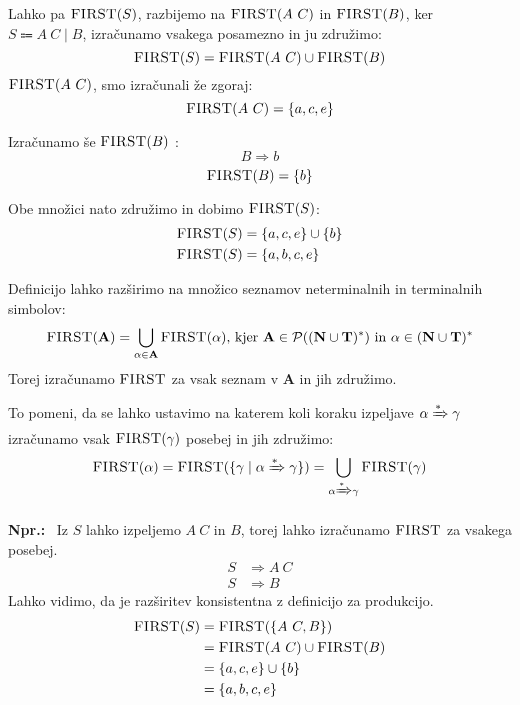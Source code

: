 \documentclass{article}
\newcommand{\Ex}{\textbf{Npr.:}\ }
\newcommand{\FIRST}{\textsc{FIRST}}
\newcommand{\Set}[1]{\mathbf{#1}}
\newcommand{\Terminals}{\Set{T}}
\newcommand{\NonTerminals}{\Set{N}}
\newcommand{\Powerset}[1]{\mathcal{P}(#1)}
\newcommand{\Arrow}{\Coloneqq}
\newcommand{\Derive}{\Rightarrow}
\newcommand{\DeriveStar}{\xRightarrow{\ast}}
\newcommand{\Seq}{\ }
\newcommand{\Union}{\mathrel{|}}
\newcommand{\Kleene}[1]{#1^\ast}
\begin{document}
Lahko pa $\FIRST(S)$, razbijemo na $\FIRST(A \Seq C)$ in $\FIRST(B)$, ker $S \Arrow A \Seq C \Union B$, izračunamo vsakega posamezno in ju združimo:
\begin{equation*}
  \FIRST(S) = \FIRST(A \Seq C) \cup \FIRST(B)
\end{equation*}
$\FIRST(A \Seq C)$, smo izračunali že zgoraj:
\begin{equation*}
  \FIRST(A \Seq C) = \{a, c, e\}
\end{equation*}

Izračunamo še $\FIRST(B)$ :
\begin{equation*}
  B \Derive b
\end{equation*}
\begin{equation*}
  \FIRST(B) = \{b\}
\end{equation*}

Obe množici nato združimo in dobimo $\FIRST(S)$:
\begin{align*}
  \FIRST(S) &= \{a, c, e\} \cup \{b\}\\
  \FIRST(S) &= \{a, b, c, e\}
\end{align*}

Definicijo lahko razširimo na množico seznamov neterminalnih in terminalnih simbolov:
\begin{equation*}
  \FIRST(\Set{A}) = \bigcup_{\alpha \in \Set{A}} \FIRST(\alpha) \text{, kjer } \Set{A} \in \Powerset{\Kleene{(\NonTerminals \cup \Terminals)}} \text{ in } \alpha \in \Kleene{(\NonTerminals \cup \Terminals)}
\end{equation*}
Torej izračunamo $\FIRST$ za vsak seznam v $\Set{A}$ in jih združimo.

To pomeni, da se lahko ustavimo na katerem koli koraku izpeljave $\alpha \DeriveStar \gamma$ izračunamo vsak $\FIRST(\gamma)$ posebej in jih združimo:
\begin{equation*}
  \FIRST(\alpha) = \FIRST(\{\gamma \mid \alpha \DeriveStar \gamma\}) = \bigcup_{\alpha \DeriveStar \gamma} \FIRST(\gamma)
\end{equation*}

\Ex
  Iz $S$ lahko izpeljemo $A \Seq C$ in $B$, torej lahko izračunamo $\FIRST$ za vsakega posebej.
  \begin{align*}
    S &\Derive A \Seq C\\
    S &\Derive B
  \end{align*}
  Lahko vidimo, da je razširitev konsistentna z definicijo za produkcijo.
  \begin{align*}
    \FIRST(S) &= \FIRST(\{A \Seq C, B\}) \\
              &= \FIRST(A \Seq C) \cup \FIRST(B)\\
              &= \{a, c, e\} \cup \{b\} \\
              &= \{a, b, c, e\}
  \end{align*}
\end{document}
